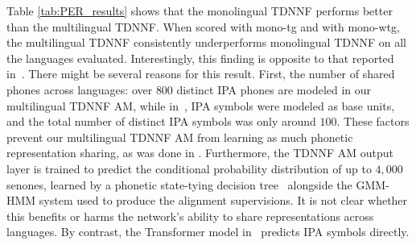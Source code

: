 \documentclass{article}
\begin{document}
 Table \ref{tab:PER_results} shows that the
 monolingual TDNNF performs better than the multilingual TDNNF. 
 When scored with mono-tg and with mono-wtg, the multilingual TDNNF consistently underperforms monolingual TDNNF on all the languages evaluated.
 Interestingly, this finding is opposite to that reported in~\cite{Zelasko2020That}. There might be several reasons for this result. First, the number of shared phones across languages: over $800$ distinct IPA phones are modeled in our multilingual TDNNF AM, while in~\cite{Zelasko2020That}, IPA symbols were modeled as base units, and the total number of distinct IPA symbols was only around $100$. These factors prevent our multilingual TDNNF AM from learning as much phonetic representation sharing, as was done in \cite{Zelasko2020That}. Furthermore, the TDNNF AM output layer is trained to predict the conditional probability distribution of up to $4,000$ senones, learned by a phonetic state-tying decision tree~\cite{young1994tree} alongside the GMM-HMM system used to produce the alignment supervisions. It is not clear whether this benefits or harms the network's ability to share representations across languages. By contrast, the Transformer model in~\cite{Zelasko2020That} predicts IPA symbols directly.
 
\end{document}
